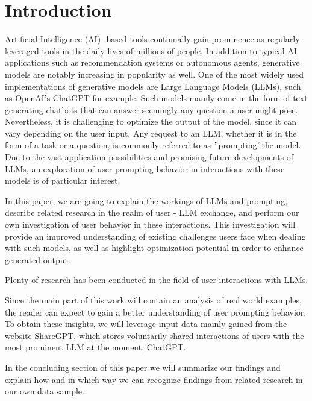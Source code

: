
\section{Introduction}
\label{sec:introduction}

\sloppy %
Artificial Intelligence (AI) -based tools continually gain prominence as regularly leveraged tools in the
daily lives of millions of people.
In addition to typical AI applications such as recommendation systems or autonomous agents, generative
models are notably increasing in popularity as well.
One of the most widely used implementations of generative models are Large Language Models (LLMs),
such as OpenAI's ChatGPT for example. %
Such models mainly come in the form of text generating chatbots that can answer seemingly any question
a user might pose.
Nevertheless, it is challenging to optimize the output of the model, since it can vary depending
on the user input. %
Any request to an LLM, whether it is in the form of a task or a question, is commonly referred to as
\("\)prompting\("\)the model.
Due to the vast application possibilities and promising future developments of LLMs,
an exploration of user prompting behavior in interactions with these models is of particular interest.

In this paper, we are going to explain the workings of LLMs and prompting, describe related research
in the realm of user - LLM exchange, and perform our own investigation of user behavior in these
interactions.
This investigation will provide an improved understanding of existing challenges users face when
dealing with such models, as well as highlight optimization potential in order to enhance generated
output.

Plenty of research has been conducted in the field of user interactions with LLMs.

Since the main part of this work will contain an analysis of real world examples, the reader can
expect to gain a better understanding of user prompting behavior.
To obtain these insights, we will leverage input data mainly gained from the website ShareGPT, %
which stores voluntarily shared interactions of users with the most prominent LLM at the moment,
ChatGPT. %

In the concluding section of this paper we will summarize our findings and explain how and in which way
we can recognize findings from related research in our own data sample.
